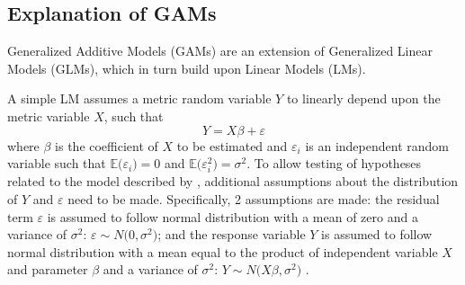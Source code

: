 \subsection{Explanation of GAMs}

Generalized Additive Models (GAMs) are an extension of Generalized Linear Models (GLMs), which in turn build upon Linear Models (LMs).


A simple LM assumes a metric random variable \(Y\) to linearly depend upon the metric variable \(X\), such that
\begin{equation}
  \label{eq:LinearModel}
  Y = X \beta + \varepsilon
\end{equation}
where \(\beta\) is the coefficient of \(X\) to be estimated and \(\varepsilon_i\) is an independent random variable such that \(\mathbb{E}\bigl(\varepsilon_i\bigr) = 0\) and \(\mathbb{E}\bigl(\varepsilon_i^2\bigr) = \sigma^2\).  To allow testing of hypotheses related to the model described by , additional assumptions about the distribution of \(Y\) and \(\varepsilon\) need to be made.  Specifically, 2 assumptions are made: the residual term \(\varepsilon\) is assumed to follow normal distribution with a mean of zero and a variance of \(\sigma^2\): \(\varepsilon \sim N\bigl(0, \sigma^2\bigr)\); and the response variable \(Y\) is assumed to follow normal distribution with a mean equal to the product of independent variable \(X\) and parameter \(\beta\) and a variance of \(\sigma^2\): \(Y \sim N\bigl(X \beta, \sigma^2\bigr) \) \parencite{Wood2006,Burkschat2012}.


